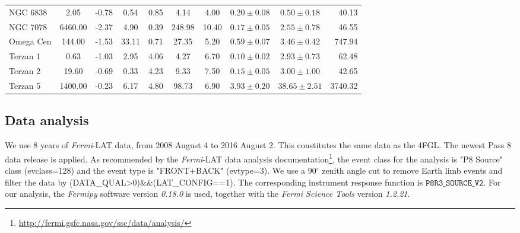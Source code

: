 \documentclass[doublespace,nopageskip]{VTthesis} %
\begin{document}
\begin{table}
{\begin{tabular}{lccccccccr}
NGC 6838 & 2.05 & -0.78 & 0.54 & 0.85 & 4.14 & 4.00 & $0.20 \pm 0.08$ & $0.50 \pm 0.18$ & 40.13\\
NGC 7078 & 6460.00 & -2.37 & 4.90 & 0.39 & 248.98 & 10.40 & $0.17 \pm 0.05$ & $2.55 \pm 0.78$ & 46.55\\
Omega Cen & 144.00 & -1.53 & 33.11 & 0.71 & 27.35 & 5.20 & $0.59 \pm 0.07$ & $3.46 \pm 0.42$ & 747.94\\
Terzan 1 & 0.63 & -1.03 & 2.95 & 4.06 & 4.27 & 6.70 & $0.10 \pm 0.02$ & $2.93 \pm 0.73$ & 62.48\\
Terzan 2 & 19.60 & -0.69 & 0.33 & 4.23 & 9.33 & 7.50 & $0.15 \pm 0.05$ & $3.00 \pm 1.00$ & 42.65\\
Terzan 5 & 1400.00 & -0.23 & 6.17 & 4.80 & 98.73 & 6.90 & $3.93 \pm 0.20$ & $38.65 \pm 2.51$ & 3740.32\\
\bottomrule
\end{tabular}
}
\end{table}

\subsection{Data analysis}\label{sec:data}

We use 8 years of \textit{Fermi}-LAT data, from 2008 August 4 to 2016 August 2. This constitutes the same data as the 4FGL. The newest Pass 8 data release is applied. As recommended by the \textit{Fermi}-LAT data analysis documentation\footnote{\url{http://fermi.gsfc.nasa.gov/ssc/data/analysis/}}, the event class for the analysis is "P8 Source" class (evclass=128) and the event type is "FRONT+BACK" (evtype=3). We use a 90$^{\circ}$ zenith angle cut to remove Earth limb events and filter the data by (DATA\_QUAL>0)\&\&(LAT\_CONFIG==1). The corresponding instrument response function is $\texttt{P8R3\_SOURCE\_V2}$. For our analysis, the \textit{Fermipy} software version \textit{0.18.0} is used, together with the \textit{Fermi Science Tools} version \textit{1.2.21}.
\end{document}
